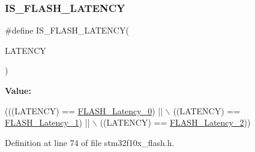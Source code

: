 \subsubsection{\texorpdfstring{I\+S\+\_\+\+F\+L\+A\+S\+H\+\_\+\+L\+A\+T\+E\+N\+CY}{IS\_FLASH\_LATENCY}}
{\footnotesize\ttfamily \#define I\+S\+\_\+\+F\+L\+A\+S\+H\+\_\+\+L\+A\+T\+E\+N\+CY(\begin{DoxyParamCaption}\item[{}]{L\+A\+T\+E\+N\+CY }\end{DoxyParamCaption})}

{\bfseries Value\+:}
\begin{DoxyCode}
(((LATENCY) == \hyperlink{group___flash___latency_ga09afe6e52b819cc074f6111ec42ac3c3}{FLASH\_Latency\_0}) || \(\backslash\)
                                   ((LATENCY) == \hyperlink{group___flash___latency_ga6b7281665340fe8f7919bdfcfd06f8e6}{FLASH\_Latency\_1}) || \(\backslash\)
                                   ((LATENCY) == \hyperlink{group___flash___latency_ga55173ebb5c978459ce18d5e2516e3e89}{FLASH\_Latency\_2}))
\end{DoxyCode}


Definition at line 74 of file stm32f10x\+\_\+flash.\+h.

